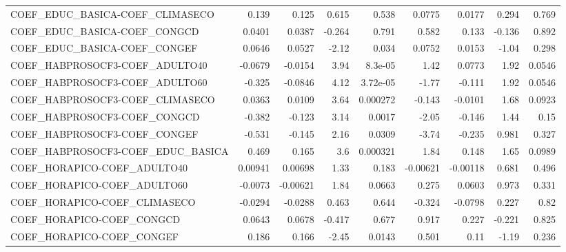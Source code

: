 \begin{tabular}{lrrrrrrrr}
COEF\_EDUC\_BASICA-COEF\_CLIMASECO       &       0.139 &        0.125 &    0.615 &    0.538 &     0.0775 &      0.0177 &        0.294 &         0.769 \\
COEF\_EDUC\_BASICA-COEF\_CONGCD          &      0.0401 &       0.0387 &   -0.264 &    0.791 &      0.582 &       0.133 &       -0.136 &         0.892 \\
COEF\_EDUC\_BASICA-COEF\_CONGEF          &      0.0646 &       0.0527 &    -2.12 &    0.034 &     0.0752 &      0.0153 &        -1.04 &         0.298 \\
COEF\_HABPROSOCF3-COEF\_ADULTO40        &     -0.0679 &      -0.0154 &     3.94 &  8.3e-05 &       1.42 &      0.0773 &         1.92 &        0.0546 \\
COEF\_HABPROSOCF3-COEF\_ADULTO60        &      -0.325 &      -0.0846 &     4.12 & 3.72e-05 &      -1.77 &      -0.111 &         1.92 &        0.0546 \\
COEF\_HABPROSOCF3-COEF\_CLIMASECO       &      0.0363 &       0.0109 &     3.64 & 0.000272 &     -0.143 &     -0.0101 &         1.68 &        0.0923 \\
COEF\_HABPROSOCF3-COEF\_CONGCD          &      -0.382 &       -0.123 &     3.14 &   0.0017 &      -2.05 &      -0.146 &         1.44 &          0.15 \\
COEF\_HABPROSOCF3-COEF\_CONGEF          &      -0.531 &       -0.145 &     2.16 &   0.0309 &      -3.74 &      -0.235 &        0.981 &         0.327 \\
COEF\_HABPROSOCF3-COEF\_EDUC\_BASICA     &       0.469 &        0.165 &      3.6 & 0.000321 &       1.84 &       0.148 &         1.65 &        0.0989 \\
COEF\_HORAPICO-COEF\_ADULTO40           &     0.00941 &      0.00698 &     1.33 &    0.183 &   -0.00621 &    -0.00118 &        0.681 &         0.496 \\
COEF\_HORAPICO-COEF\_ADULTO60           &     -0.0073 &     -0.00621 &     1.84 &   0.0663 &      0.275 &      0.0603 &        0.973 &         0.331 \\
COEF\_HORAPICO-COEF\_CLIMASECO          &     -0.0294 &      -0.0288 &    0.463 &    0.644 &     -0.324 &     -0.0798 &        0.227 &          0.82 \\
COEF\_HORAPICO-COEF\_CONGCD             &      0.0643 &       0.0678 &   -0.417 &    0.677 &      0.917 &       0.227 &       -0.221 &         0.825 \\
COEF\_HORAPICO-COEF\_CONGEF             &       0.186 &        0.166 &    -2.45 &   0.0143 &      0.501 &        0.11 &        -1.19 &         0.236 \\

\end{tabular}
